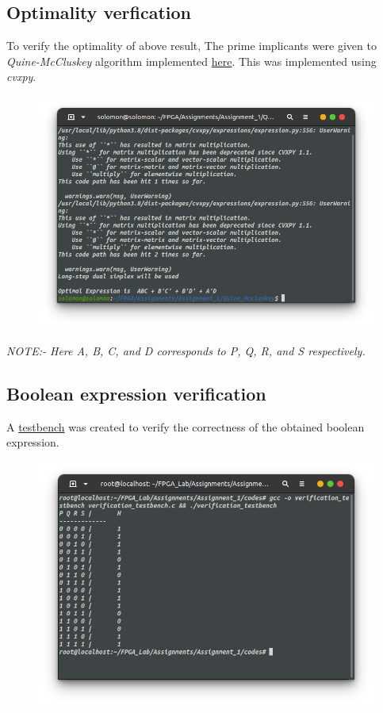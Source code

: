 \documentclass{article}
\begin{document}
\subsection*{Optimality verfication}
To verify the optimality of above result, The prime implicants were given to \textit{Quine-McCluskey} algorithm implemented \href{https://github.com/TUdayKiranReddy/FPGA_Lab/tree/main/Assignments/Assignment_1/Quine_Mccluskey}{here}. This was implemented using \textit{cvxpy}.
\begin{figure}[!h]
\includegraphics[scale=0.45]{./figs/opt.png}
\end{figure}

\textit{NOTE:- Here A, B, C, and D corresponds to P, Q, R, and S respectively.}
    
\subsection*{Boolean expression verification}
A \href{https://github.com/TUdayKiranReddy/FPGA_Lab/tree/main/Assignments/Assignment_1/codes/verification_testbench.c}{testbench} was created to verify the correctness of the obtained boolean expression.
\begin{figure}[h!]
\includegraphics[scale=0.45]{./figs/ver.png}
\end{figure}
\end{document}
